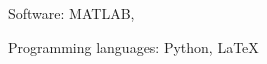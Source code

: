 
\begin{tabitemize}
\item  Software: MATLAB,
\item  Programming languages: Python, \LaTeX
\end{tabitemize}




\vspace{-3mm}
